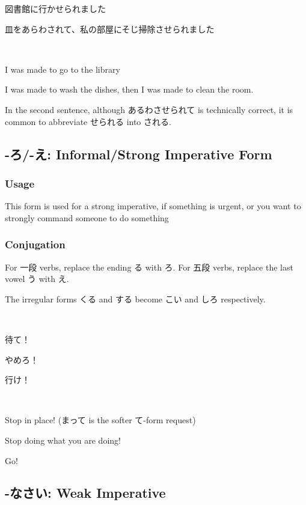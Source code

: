 \documentclass{article}
\begin{document}
\begin{CJK}{UTF8}{min}
\begin{example}
図書館に行かせられました

皿をあらわされて、私の部屋にそじ掃除させられました
\end{example}

\begin{solution}
\ 

I was made to go to the library

I was made to wash the dishes, then I was made to clean the room.
\end{solution}

In the second sentence, although あるわさせられて is technically correct, it is common to abbreviate せられる into される.

\subsection{-ろ/-え: Informal/Strong Imperative Form}

\subsubsection{Usage}

This form is used for a strong imperative, if something is urgent, or you want to strongly command someone to do something

\subsubsection{Conjugation}

For 一段 verbs, replace the ending る with ろ. For 五段 verbs, replace the last vowel う with え.

The irregular forms くる and する become こい and しろ respectively.
\begin{example}
\ 

待て！

やめろ！

行け！
\end{example}

\begin{solution}
\ 

Stop in place! (まって is the softer て-form request)

Stop doing what you are doing!

Go!
\end{solution}

\subsection{-なさい: Weak Imperative}


\end{CJK}
\end{document}
